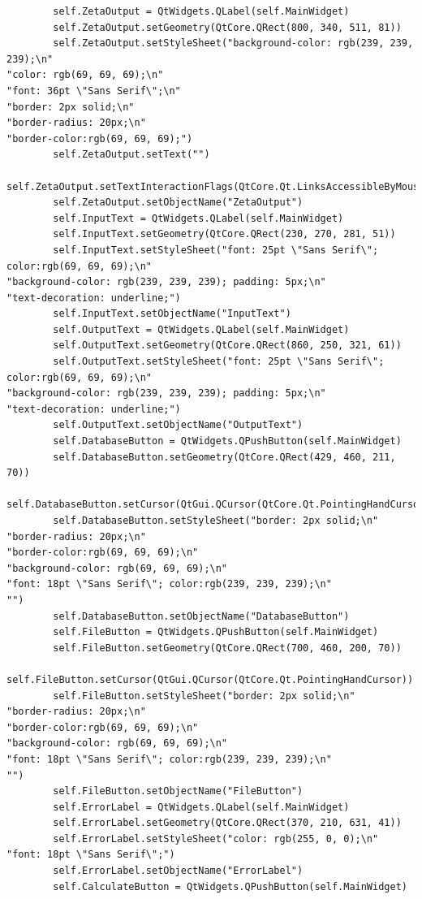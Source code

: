 \documentclass{article}
\begin{document}
\begin{lstlisting}
        self.ZetaOutput = QtWidgets.QLabel(self.MainWidget)
        self.ZetaOutput.setGeometry(QtCore.QRect(800, 340, 511, 81))
        self.ZetaOutput.setStyleSheet("background-color: rgb(239, 239, 239);\n"
"color: rgb(69, 69, 69);\n"
"font: 36pt \"Sans Serif\";\n"
"border: 2px solid;\n"
"border-radius: 20px;\n"
"border-color:rgb(69, 69, 69);")
        self.ZetaOutput.setText("")
        self.ZetaOutput.setTextInteractionFlags(QtCore.Qt.LinksAccessibleByMouse|QtCore.Qt.TextSelectableByKeyboard|QtCore.Qt.TextSelectableByMouse)
        self.ZetaOutput.setObjectName("ZetaOutput")
        self.InputText = QtWidgets.QLabel(self.MainWidget)
        self.InputText.setGeometry(QtCore.QRect(230, 270, 281, 51))
        self.InputText.setStyleSheet("font: 25pt \"Sans Serif\"; color:rgb(69, 69, 69);\n"
"background-color: rgb(239, 239, 239); padding: 5px;\n"
"text-decoration: underline;")
        self.InputText.setObjectName("InputText")
        self.OutputText = QtWidgets.QLabel(self.MainWidget)
        self.OutputText.setGeometry(QtCore.QRect(860, 250, 321, 61))
        self.OutputText.setStyleSheet("font: 25pt \"Sans Serif\"; color:rgb(69, 69, 69);\n"
"background-color: rgb(239, 239, 239); padding: 5px;\n"
"text-decoration: underline;")
        self.OutputText.setObjectName("OutputText")
        self.DatabaseButton = QtWidgets.QPushButton(self.MainWidget)
        self.DatabaseButton.setGeometry(QtCore.QRect(429, 460, 211, 70))
        self.DatabaseButton.setCursor(QtGui.QCursor(QtCore.Qt.PointingHandCursor))
        self.DatabaseButton.setStyleSheet("border: 2px solid;\n"
"border-radius: 20px;\n"
"border-color:rgb(69, 69, 69);\n"
"background-color: rgb(69, 69, 69);\n"
"font: 18pt \"Sans Serif\"; color:rgb(239, 239, 239);\n"
"")
        self.DatabaseButton.setObjectName("DatabaseButton")
        self.FileButton = QtWidgets.QPushButton(self.MainWidget)
        self.FileButton.setGeometry(QtCore.QRect(700, 460, 200, 70))
        self.FileButton.setCursor(QtGui.QCursor(QtCore.Qt.PointingHandCursor))
        self.FileButton.setStyleSheet("border: 2px solid;\n"
"border-radius: 20px;\n"
"border-color:rgb(69, 69, 69);\n"
"background-color: rgb(69, 69, 69);\n"
"font: 18pt \"Sans Serif\"; color:rgb(239, 239, 239);\n"
"")
        self.FileButton.setObjectName("FileButton")
        self.ErrorLabel = QtWidgets.QLabel(self.MainWidget)
        self.ErrorLabel.setGeometry(QtCore.QRect(370, 210, 631, 41))
        self.ErrorLabel.setStyleSheet("color: rgb(255, 0, 0);\n"
"font: 18pt \"Sans Serif\";")
        self.ErrorLabel.setObjectName("ErrorLabel")
        self.CalculateButton = QtWidgets.QPushButton(self.MainWidget)

\end{lstlisting}
\end{document}
